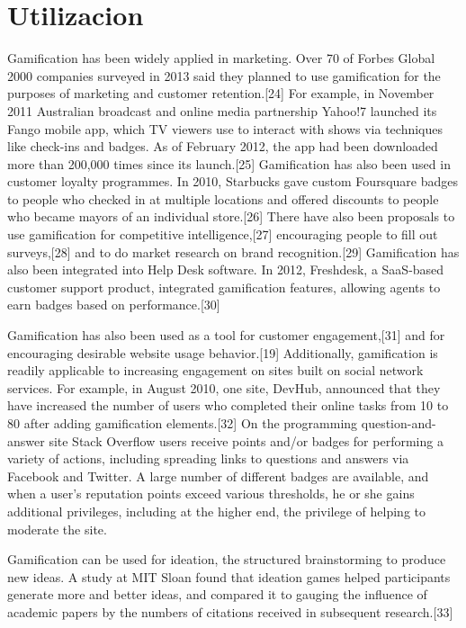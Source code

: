 \section{Utilizacion}

Gamification has been widely applied in marketing. Over 70 of Forbes Global 2000 companies surveyed in 2013 said they planned to use gamification for the purposes of marketing and customer retention.[24] For example, in November 2011 Australian broadcast and online media partnership Yahoo!7 launched its Fango mobile app, which TV viewers use to interact with shows via techniques like check-ins and badges. As of February 2012, the app had been downloaded more than 200,000 times since its launch.[25] Gamification has also been used in customer loyalty programmes. In 2010, Starbucks gave custom Foursquare badges to people who checked in at multiple locations and offered discounts to people who became mayors of an individual store.[26] There have also been proposals to use gamification for competitive intelligence,[27] encouraging people to fill out surveys,[28] and to do market research on brand recognition.[29] Gamification has also been integrated into Help Desk software. In 2012, Freshdesk, a SaaS-based customer support product, integrated gamification features, allowing agents to earn badges based on performance.[30]

Gamification has also been used as a tool for customer engagement,[31] and for encouraging desirable website usage behavior.[19] Additionally, gamification is readily applicable to increasing engagement on sites built on social network services. For example, in August 2010, one site, DevHub, announced that they have increased the number of users who completed their online tasks from 10 to 80 after adding gamification elements.[32] On the programming question-and-answer site Stack Overflow users receive points and/or badges for performing a variety of actions, including spreading links to questions and answers via Facebook and Twitter. A large number of different badges are available, and when a user's reputation points exceed various thresholds, he or she gains additional privileges, including at the higher end, the privilege of helping to moderate the site.

Gamification can be used for ideation, the structured brainstorming to produce new ideas. A study at MIT Sloan found that ideation games helped participants generate more and better ideas, and compared it to gauging the influence of academic papers by the numbers of citations received in subsequent research.[33]

